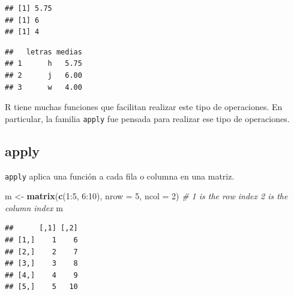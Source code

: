\documentclass[]{article}
\newenvironment{Shaded}{\begin{snugshade}}{\end{snugshade}}
\newcommand{\KeywordTok}[1]{\textcolor[rgb]{0.13,0.29,0.53}{\textbf{{#1}}}}
\newcommand{\DataTypeTok}[1]{\textcolor[rgb]{0.13,0.29,0.53}{{#1}}}
\newcommand{\DecValTok}[1]{\textcolor[rgb]{0.00,0.00,0.81}{{#1}}}
\newcommand{\StringTok}[1]{\textcolor[rgb]{0.31,0.60,0.02}{{#1}}}
\newcommand{\CommentTok}[1]{\textcolor[rgb]{0.56,0.35,0.01}{\textit{{#1}}}}
\newcommand{\NormalTok}[1]{{#1}}
\begin{document}
\begin{verbatim}
## [1] 5.75
## [1] 6
## [1] 4
\end{verbatim}

\begin{Shaded}
\end{Shaded}

\begin{verbatim}
##   letras medias
## 1      h   5.75
## 2      j   6.00
## 3      w   4.00
\end{verbatim}

R tiene muchas funciones que facilitan realizar este tipo de
operaciones. En particular, la familia \texttt{apply} fue pensada para
realizar ese tipo de operaciones.

\subsection{apply}\label{apply}

\texttt{apply} aplica una función a cada fila o columna en una matriz.

\begin{Shaded}
\begin{Highlighting}[]
\NormalTok{m <-}\StringTok{ }\KeywordTok{matrix}\NormalTok{(}\KeywordTok{c}\NormalTok{(}\DecValTok{1}\NormalTok{:}\DecValTok{5}\NormalTok{, }\DecValTok{6}\NormalTok{:}\DecValTok{10}\NormalTok{), }\DataTypeTok{nrow =} \DecValTok{5}\NormalTok{, }\DataTypeTok{ncol =} \DecValTok{2}\NormalTok{)}
\CommentTok{# 1 is the row index 2 is the column index}
\NormalTok{m}
\end{Highlighting}
\end{Shaded}

\begin{verbatim}
##      [,1] [,2]
## [1,]    1    6
## [2,]    2    7
## [3,]    3    8
## [4,]    4    9
## [5,]    5   10
\end{verbatim}
\end{document}
